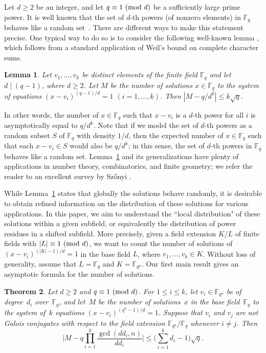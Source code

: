 \documentclass[12pt,reqno]{amsart}
\newtheorem{thm}{Theorem}[section]
\newtheorem{lem}[thm]{Lemma}
\theoremstyle{definition}
\newcommand{\F}{\mathbb{F}}
\renewcommand{\pmod}[1]{{\ifmmode\text{\rm\ (mod~$#1$)}\else\discretionary{}{}{\hbox{ }}\rm(mod~$#1$)\fi}}
\begin{document}
Let $d\geq 2$ be an integer, and let $q\equiv 1 \pmod d$ be a sufficiently large prime power. It is well known that the set of $d$-th powers (of nonzero elements) in $\F_q$ behaves like a random set~\cite{S01}. There are different ways to make this statement precise. One typical way to do so is to consider the following well-known lemma \cite[Exercise 5.66]{LN97}, which follows from a standard application of Weil's bound on complete character sums.
\begin{lem}\label{lem1}
Let $v_{1}, \ldots, v_{k}$ be distinct elements of the finite field $\F_q$ and let $d \mid (q-1)$, where $d \geq 2$. Let $M$ be the number of solutions $x \in \F_q$ to the system of equations $\left(x-v_i\right)^{(q-1) / d}=1$ $(i=1, \ldots, k)$. Then $|M-q / d^{k}|\leq k\sqrt{q}$.
\end{lem}
In other words, the number of $x \in \F_q$ such that $x-v_i$ is a $d$-th power for all $i$ is asymptotically equal to $q/d^k$. Note that if we model the set of $d$-th powers as a random subset $S$ of $\F_q$ with density $1/d$, then the expected number of $x \in \F_q$ such that each $x-v_i \in S$ would also be $q/d^k$; in this sense, the set of $d$-th powers in $\F_q$ behaves like a random set. Lemma~\ref{lem1} and its generalizations have plenty of applications in number theory, combinatorics, and finite geometry; we refer the reader to an excellent survey by Sz\H{o}nyi \cite{S97}.

While Lemma~\ref{lem1} states that globally the solutions behave randomly, it is desirable to obtain refined information on the distribution of these solutions for various applications. In this paper, we aim to understand the ``local distribution" of these solutions within a given subfield, or equivalently the distribution of power residues in a shifted subfield. More precisely, given a field extension $K/L$ of finite fields with $|L| \equiv 1 \pmod d$, we want to count the number of solutions of $(x-v_i)^{(|K|-1)/d}=1$ in the base field $L$, where $v_{1}, \ldots, v_{k}\in K$. Without loss of generality, assume that $L=\F_q$ and $K=\F_{q^n}$. 
Our first main result gives an asymptotic formula for the number of solutions.

\begin{thm}\label{thm:main}
Let $d \geq 2$ and $q \equiv 1 \pmod d$.
For $1\leq i \leq k$,
let $v_i \in \F_{q^n}$ be of degree~$d_i$ over~$\F_q$, and
let~$M$ be the number of solutions~$x$ in the base field~$\F_q$ to the system of~$k$ equations $(x-v_i)^{(q^n-1)/d}=1$.
Suppose that $v_i$ and $v_j$ are not Galois conjugates with respect to the field extension $\F_{q^n}/\F_q$ whenever $i \neq j$.
Then
$$
\bigg |M- q \prod_{i=1}^k  \frac{\gcd(dd_i,n)}{dd_i}\bigg|\leq \bigg(\sum_{i=1}^k d_i {}-1\bigg)\sqrt{q}.
$$
\end{thm}
\end{document}
